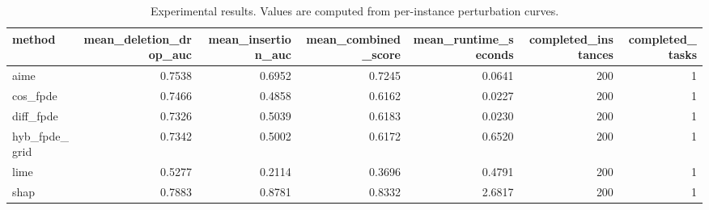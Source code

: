\begin{table}[t]
\caption{Experimental results. Values are computed from per-instance perturbation curves.}
\label{tab:main_results_computed}
\centering
\begin{tabular}{lrrrrrr}
\toprule
method & mean\_deletion\_drop\_auc & mean\_insertion\_auc & mean\_combined\_score & mean\_runtime\_seconds & completed\_instances & completed\_tasks \\
\midrule
aime & 0.7538 & 0.6952 & 0.7245 & 0.0641 & 200 & 1 \\
cos\_fpde & 0.7466 & 0.4858 & 0.6162 & 0.0227 & 200 & 1 \\
diff\_fpde & 0.7326 & 0.5039 & 0.6183 & 0.0230 & 200 & 1 \\
hyb\_fpde\_grid & 0.7342 & 0.5002 & 0.6172 & 0.6520 & 200 & 1 \\
lime & 0.5277 & 0.2114 & 0.3696 & 0.4791 & 200 & 1 \\
shap & 0.7883 & 0.8781 & 0.8332 & 2.6817 & 200 & 1 \\
\bottomrule
\end{tabular}

\end{table}

